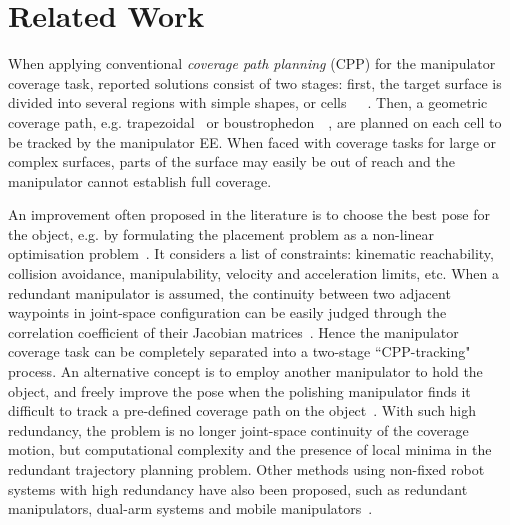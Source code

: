 \documentclass[letterpaper,journal]{IEEEtran}
\begin{document}
\section{Related Work}
\label{sectionrelatedwork}
When applying conventional \textit{coverage path planning} (CPP) for the manipulator coverage task, reported solutions consist of two stages: first, the target surface is divided into several regions with simple shapes, or cells~\cite{lumelsky1990dynamic}~\cite{choset2000exact}~\cite{Acar2002Morse}. Then, a geometric coverage path, e.g. trapezoidal~\cite{choset2005principles} or boustrophedon~\cite{choset1998coverage}~\cite{choset2000coverage}, are planned on each cell to be tracked by the manipulator EE. 
When faced with coverage tasks for large or complex surfaces, parts of the surface may easily be out of reach and the manipulator cannot establish full coverage. 

An improvement often proposed in the literature is to choose the best pose for the object, e.g. by formulating the placement problem as a non-linear optimisation problem~\cite{Malhan2019Identifying}. It considers a list of constraints: kinematic reachability, collision avoidance, manipulability, velocity and acceleration limits, etc. 
When a redundant manipulator is assumed, the continuity between two adjacent waypoints in joint-space configuration can be easily judged through the correlation coefficient of their Jacobian matrices~\cite{Chen2002Correlation}. Hence the manipulator coverage task can be completely separated into a two-stage ``CPP-tracking" process. An alternative concept is to employ another manipulator to hold the object, and freely improve the pose when the polishing manipulator finds it difficult to track a pre-defined coverage path on the object~\cite{Kabir2019Generation}. With such high redundancy, the problem is no longer joint-space continuity of the coverage motion, but computational complexity and the presence of local minima in the redundant trajectory planning problem. 
Other methods using non-fixed robot systems with high redundancy have also been  proposed, such as redundant manipulators, dual-arm systems and mobile manipulators~\cite{Atkar2003Towards}. 
\end{document}
